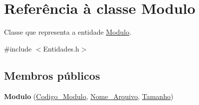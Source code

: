\hypertarget{class_modulo}{
\section{\-Referência à classe \-Modulo}
\label{class_modulo}
}


\-Classe que representa a entidade \hyperlink{class_modulo}{\-Modulo}.  




{\ttfamily \#include $<$\-Entidades.\-h$>$}

\subsection*{\-Membros públicos}
\begin{DoxyCompactItemize}
\item 
\hypertarget{class_modulo_ad4dc51b22b8bd726070b683fce87fa52}{
{\bfseries \-Modulo} (\hyperlink{class_codigo___modulo}{\-Codigo\-\_\-\-Modulo}, \hyperlink{class_nome___arquivo}{\-Nome\-\_\-\-Arquivo}, \hyperlink{class_tamanho}{\-Tamanho})}
\label{class_modulo_ad4dc51b22b8bd726070b683fce87fa52}


\end{DoxyCompactItemize}
